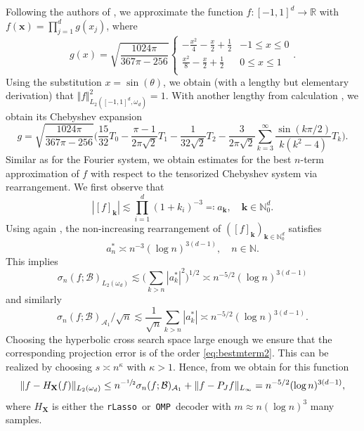 \documentclass[11pt,reqno, a4paper]{article}
\numberwithin{equation}{section}
\newcommand{\R}{\mathbb{R}}
\newcommand{\rlasso}{\texttt{rLasso}}
\newcommand{\omp}{\texttt{OMP}}
\begin{document}
Following the authors of \cite{BarLutNag2023}, we approximate the function $f \colon [-1,1]^d \to \R$ with $f(\mathbf{x}) = \prod_{j = 1}^d g(x_j)$, where
\begin{equation}
    g(x) = \sqrt{\frac{1024\pi}{367\pi-256}}\begin{cases}
        -\frac{x^2}{4} - \frac{x}{2} + \frac{1}{2} & -1 \leq x \leq 0 \\
        \frac{x^2}{8} - \frac{x}{2} + \frac{1}{2} & 0 \leq x \leq 1\\
    \end{cases}.
\end{equation}
Using the substitution $x = \sin(\theta)$, we obtain (with a lengthy but elementary derivation) that $\Vert f \Vert^2_{L_2([-1,1]^d,\omega_d)} = 1$.
With another lengthy from calculation \cite{BarLutNag2023}, we obtain its Chebyshev expansion
\begin{equation}
    g = \sqrt{\frac{1024\pi}{367\pi-256}}\biggl(\frac{15}{32}T_0 - \frac{\pi-1}{2\pi\sqrt{2}}T_1 -\frac{1}{32\sqrt{2}}T_2-\frac{3}{2\pi\sqrt{2}}\sum\limits_{k=3}^{\infty}\frac{\sin(k\pi/2)}{k(k^2-4)}T_k\biggr).
\end{equation}
Similar as for the Fourier system, we obtain estimates for the best $n$-term approximation of $f$ with respect to the tensorized Chebyshev system via rearrangement. We first observe that 
\begin{equation}
    |[f]_{\mathbf{k}}| \lesssim \prod\limits_{i=1}^d (1+k_i)^{-3}\eqqcolon a_{\mathbf{k}},\quad \mathbf{k} \in \mathbb{N}_0^d.
\end{equation}
Using again \cite{KSU15}, the non-increasing rearrangement of  $([f]_{\mathbf{k}})_{\mathbf{k}\in \mathbb{N}_0^d}$ satisfies 
\begin{equation}
    a^*_n \asymp n^{-3}(\log n)^{3(d-1)},\quad n\in \mathbb{N}.
\end{equation}
This implies  
\begin{equation}
    \sigma_n(f;\mathcal{B})_{L_2(\omega_d)} \lesssim \biggl(\sum\limits_{k>n} |a^*_k|^2 \biggr)^{1/2} \asymp n^{-5/2}(\log n)^{3(d-1)}
\end{equation}
and similarly
\begin{equation}
    \sigma_n(f;\mathcal{B})_{\mathcal{A}_1}/\sqrt{n} \lesssim \frac{1}{\sqrt{n}}\sum\limits_{k>n} |a^*_k| \asymp n^{-5/2}(\log n)^{3(d-1)}.
\end{equation}
Choosing the hyperbolic cross search space large enough we ensure that the corresponding projection error is of the order \eqref{eq:bestmterm2}.
This can be realized by choosing $s \asymp n^\kappa$ with $\kappa>1$.
Hence, from  we obtain for this function 
\begin{equation}
	\lVert f - H_{\mathbf{X}}(f)\rVert_{L_2(\omega_d)} \leq n^{-\sfrac{1}{2}}\sigma_n(f;\mathcal{B})_{\mathcal{A}_1} + \lVert f-P_{J}f\rVert_{L_\infty} = n^{-5/2}(\log n)^{3(d-1)},
\end{equation}
where $H_{\mathbf{X}}$  is either the \rlasso~or~\omp~decoder with $m\approx n(\log n)^3$ many samples. 
\end{document}
